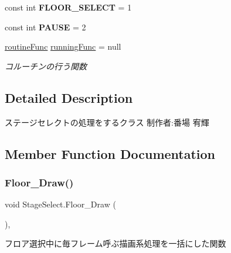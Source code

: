 \begin{DoxyCompactItemize}
const int {\bfseries F\+L\+O\+O\+R\+\_\+\+S\+E\+L\+E\+CT} = 1
\item 
\mbox{\label{class_stage_select_ae4a9274570d88bf5c074aa3d5e19e4e8}} 
const int {\bfseries P\+A\+U\+SE} = 2
\item 
\hyperlink{class_stage_select_a6b3980abcd91e390c76fc5f914554bbe}{routine\+Func} \hyperlink{class_stage_select_aad154f2d7ed55fde9d3b115f60f1f9e1}{running\+Func} = null
\begin{DoxyCompactList}\small\item\em コルーチンの行う関数 \end{DoxyCompactList}\end{DoxyCompactItemize}


\subsection{Detailed Description}
ステージセレクトの処理をするクラス 制作者\+:番場 宥輝 



\subsection{Member Function Documentation}
\mbox{\label{class_stage_select_a048ef71453d75c2e3e20f7d6a189d060}} 
\subsubsection{\texorpdfstring{Floor\+\_\+\+Draw()}{Floor\_Draw()}}
{\footnotesize\ttfamily void Stage\+Select.\+Floor\+\_\+\+Draw (\begin{DoxyParamCaption}{ }\end{DoxyParamCaption})\hspace{0.3cm}{\ttfamily [inline]}, {\ttfamily [private]}}



フロア選択中に毎フレーム呼ぶ描画系処理を一括にした関数 

\mbox{\label{class_stage_select_af7b468e46ddc79c41cecd72885256cb1}} 
